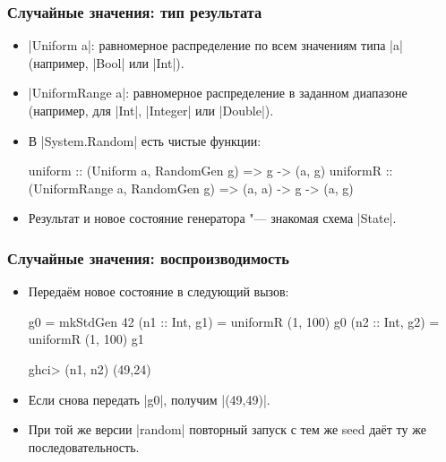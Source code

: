\documentclass[11pt]{beamer}
\begin{document}
\begin{frame}[fragile]
  \frametitle{Случайные значения: тип результата}
  \begin{itemize}
    \item \haskinline|Uniform a|: равномерное распределение по всем значениям типа \haskinline|a| (например, \haskinline|Bool| или \haskinline|Int|).
    \item \haskinline|UniformRange a|: равномерное распределение в заданном диапазоне (например, для \haskinline|Int|, \haskinline|Integer| или \haskinline|Double|).
    \item В \haskinline|System.Random| есть чистые функции:
          \begin{haskellsmall}
            uniform :: (Uniform a, RandomGen g) =>
              g -> (a, g)
            uniformR :: (UniformRange a, RandomGen g) =>
              (a, a) -> g -> (a, g)
          \end{haskellsmall}
    \item Результат и новое состояние генератора "--- знакомая схема \haskinline|State|.
  \end{itemize}
\end{frame}

\begin{frame}[fragile]
  \frametitle{Случайные значения: воспроизводимость}
  \begin{itemize}
    \item Передаём новое состояние в следующий вызов:
          \begin{haskellsmall}
            g0 = mkStdGen 42
            (n1 :: Int, g1) = uniformR (1, 100) g0
            (n2 :: Int, g2) = uniformR (1, 100) g1
          \end{haskellsmall}
          \begin{haskellsmall}
            ghci> (n1, n2)
            (49,24)
          \end{haskellsmall}
    \item Если снова передать \haskinline|g0|, \pause получим \haskinline|(49,49)|.
    \item При той же версии \haskinline|random| повторный запуск с тем же seed даёт ту же последовательность.
  \end{itemize}
\end{frame}
\end{document}
